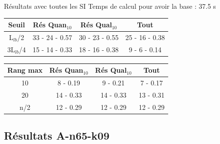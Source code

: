 \documentclass{beamer}
\begin{document}
\begin{frame}{Résultats avec toutes les SI}
Temps de calcul pour avoir la base : 37.5 s

\centering
\begin{tabular}{|c|c|c|c|}
   \hline
   Seuil & Rés Quan$_{10}$ & Rés Qual$_{10}$ & Tout \\
   \hline
   L$_{lb}$/2 & 33 - 24 - 0.57 & 30 - 23 - 0.55 & 25 - 16 - 0.38 \\
   \hline
   3L$_{lb}$/4 & 15 - 14 - 0.33 & 18 - 16 - 0.38  & 9 - 6 - 0.14 \\
   \hline
\end{tabular}

\begin{tabular}{|c|c|c|c|}
   \hline
   Rang max & Rés Quan$_{10}$ & Rés Qual$_{10}$ & Tout\\
   \hline
   10 & 8 - 0.19 & 9 - 0.21 & 7 - 0.17 \\
   \hline
   20 & 14 - 0.33 & 14 - 0.33 & 13 - 0.31\\
   \hline
   n/2 & 12 - 0.29 & 12 - 0.29 & 12 - 0.29 \\
   \hline
\end{tabular}

\end{frame}

\subsection{Résultats A-n65-k09}
\end{document}
